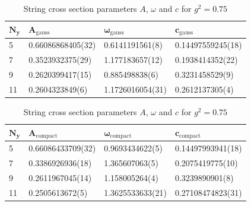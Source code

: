 \begin{table}[!hb]
\centering
\begin{tabular}{llll}
    $\mathbf{N_y}$ & $\mathbf{A_\mathrm{gauss}}$ & $\mathbf{\omega_\mathrm{gauss}}$ & $\mathbf{c_\mathrm{gauss}}$ \\ \hline
   5 & 0.66086868405(32) & 0.6141191561(8) & 0.14497559245(18) \\
   7 & 0.3523932375(29) & 1.177183657(12) & 0.1938414352(22) \\
   9 & 0.2620399417(15) & 0.885498838(6) & 0.3231458529(9) \\
   11 & 0.2604323849(6) & 1.1726016054(31) & 0.2612137305(4) \\
\end{tabular}
\begin{tabular}{llll}
    $\mathbf{N_y}$ & $\mathbf{A_\mathrm{compact}}$ & $\mathbf{\omega_\mathrm{compact}}$ & $\mathbf{c_\mathrm{compact}}$ \\ \hline
   5 & 0.66086433709(32) & 0.9693434622(5) & 0.14497993941(18) \\
   7 & 0.3386926936(18) & 1.365607063(5) & 0.2075419775(10) \\
   9 & 0.2611967045(14) & 1.158005264(4) & 0.3239890901(8) \\
   11 & 0.2505613672(5) & 1.3625533633(21) & 0.27108474823(31) \\
\end{tabular}
\caption{String cross section parameters $A$, $\omega$ and $c$ for $g^2=0.75$}
\end{table}
